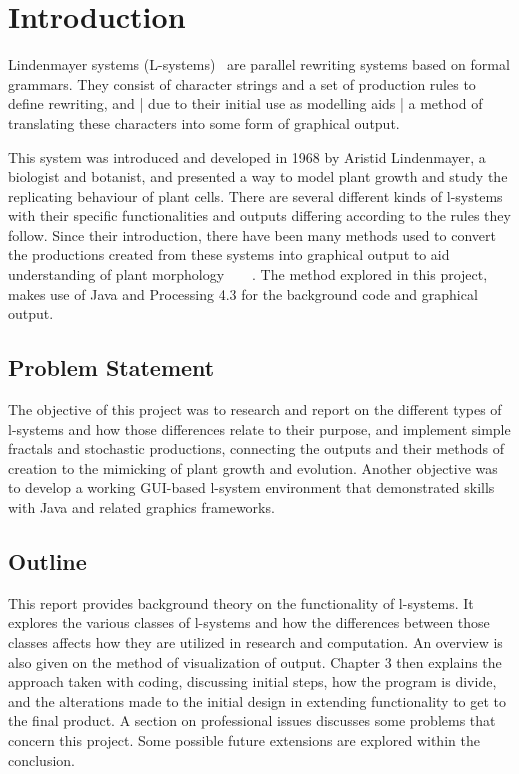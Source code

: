 \documentclass[]{final_report}
\begin{document}
\chapter{Introduction}

Lindenmayer systems (L-systems)~\cite{PRU:1990} are parallel rewriting systems based on formal grammars. They consist of character strings and a set of production rules to define rewriting, and | due to their initial use as modelling aids | a method of translating these characters into some form of graphical output.

This system was introduced and developed in 1968 by Aristid Lindenmayer, a biologist and botanist, and presented a way to model plant growth and study the replicating behaviour of plant cells. There are several different kinds of l-systems with their specific functionalities and outputs differing according to the rules they follow. Since their introduction, there have been many methods used to convert the productions created from these systems into graphical output to aid understanding of plant morphology~\cite{CUR:1999}~\cite{BUR:2013}~\cite{HEW:2017}~\cite{CGO:1997}. The method explored in this project, makes use of Java and Processing 4.3 for the background code and graphical output.

\section{Problem Statement}

The objective of this project was to research and report on the different types of l-systems and how those differences relate to their purpose, and implement simple fractals and stochastic productions, connecting the outputs and their methods of creation to the mimicking of plant growth and evolution. Another objective was to develop a working GUI-based l-system environment that demonstrated skills with Java and related graphics frameworks.

\section{Outline}

This report provides background theory on the functionality of l-systems. It explores the various classes of l-systems and how the differences between those classes affects how they are utilized in research and computation. An overview is also given on the method of visualization of output. Chapter 3 then explains the approach taken with  coding, discussing initial steps, how the program is divide, and the alterations made to the initial design in extending functionality to get to the final product. A section on professional issues discusses some problems that concern this project. Some possible future extensions are explored within the conclusion.
\end{document}
